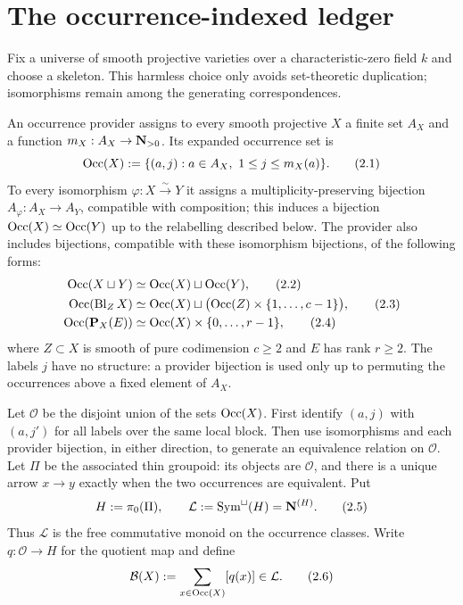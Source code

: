 \section{The occurrence-indexed ledger}
\label{sec:ledger}

Fix a universe of smooth projective varieties over a characteristic-zero
field $k$ and choose a skeleton.  This harmless choice only avoids set-theoretic
duplication; isomorphisms remain among the generating correspondences.

\begin{definition}
\label{def:provider}
An occurrence provider assigns to every smooth projective $X$ a finite set
$A_X$ and a function $m_X:A_X\to\mathbf N_{>0}$.  Its expanded occurrence set is
\[
 \operatorname{Occ}(X):=\{(a,j):a\in A_X,\ 1\le j\le m_X(a)\}.
 \tag{2.1}
\]
To every isomorphism $\varphi:X\xrightarrow{\sim}Y$ it assigns a
multiplicity-preserving bijection $A_\varphi:A_X\to A_Y$, compatible with
composition; this induces a bijection $\operatorname{Occ}(X)\simeq\operatorname{Occ}(Y)$ up to the
relabelling described below.  The provider also includes bijections,
compatible with these isomorphism bijections, of the following forms:
\begin{align}
 \operatorname{Occ}(X\sqcup Y)&\simeq \operatorname{Occ}(X)\sqcup\operatorname{Occ}(Y),
                                                        \tag{2.2}\label{eq:disjoint}\\
 \operatorname{Occ}(\operatorname{Bl}_ZX)&\simeq
   \operatorname{Occ}(X)\sqcup\bigl(\operatorname{Occ}(Z)\times\{1,\ldots,c-1\}\bigr),
                                                        \tag{2.3}\label{eq:blowup}\\
 \operatorname{Occ}(\mathbf P_X(E))&\simeq
   \operatorname{Occ}(X)\times\{0,\ldots,r-1\},
                                                        \tag{2.4}\label{eq:projective}
\end{align}
where $Z\subset X$ is smooth of pure codimension $c\ge2$ and $E$ has rank
$r\ge2$.
The labels $j$ have no structure: a provider bijection is used only up to
permuting the occurrences above a fixed element of $A_X$.
\end{definition}

Let \(\mathscr O\) be the disjoint union of the sets \(\operatorname{Occ}(X)\).  First
identify $(a,j)$ with $(a,j')$ for all labels over the same local block.
Then use isomorphisms and each provider bijection, in either direction, to
generate an equivalence relation on \(\mathscr O\).  Let
\(\Pi\) be the associated thin groupoid: its objects are \(\mathscr O\), and
there is a unique arrow $x\to y$ exactly when the two occurrences are
equivalent.  Put
\[
 H:=\pi_0(\Pi),
 \qquad
 \mathcal L:=\operatorname{Sym}^{\sqcup}(H)=\mathbf N^{(H)}.
 \tag{2.5}\label{eq:ledger}
\]
Thus \(\mathcal L\) is the free commutative monoid on the occurrence classes.
Write $q:\mathscr O\to H$ for the quotient map and define
\[
 \mathcal B(X):=\sum_{x\in\operatorname{Occ}(X)}[q(x)]\in\mathcal L.
 \tag{2.6}\label{eq:block-ledger}
\]

